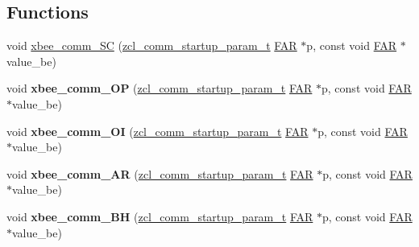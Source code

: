 \subsection*{Functions}
\begin{DoxyCompactItemize}
\item 
void \hyperlink{group__xbee__commissioning_ga886012f757de4a74d0c992d3ab04a373}{xbee\+\_\+comm\+\_\+\+SC} (\hyperlink{structzcl__comm__startup__param__t}{zcl\+\_\+comm\+\_\+startup\+\_\+param\+\_\+t} \hyperlink{group__hal_gaef060b3456fdcc093a7210a762d5f2ed}{F\+AR} $\ast$p, const void \hyperlink{group__hal_gaef060b3456fdcc093a7210a762d5f2ed}{F\+AR} $\ast$value\+\_\+be)
\item 
\mbox{\label{group__xbee__commissioning_ga38cdf15db91d2b0d3afc7288c4f4205a}} 
void {\bfseries xbee\+\_\+comm\+\_\+\+OP} (\hyperlink{structzcl__comm__startup__param__t}{zcl\+\_\+comm\+\_\+startup\+\_\+param\+\_\+t} \hyperlink{group__hal_gaef060b3456fdcc093a7210a762d5f2ed}{F\+AR} $\ast$p, const void \hyperlink{group__hal_gaef060b3456fdcc093a7210a762d5f2ed}{F\+AR} $\ast$value\+\_\+be)
\item 
\mbox{\label{group__xbee__commissioning_ga9b5ced283d3e0d514a28b676935a3b95}} 
void {\bfseries xbee\+\_\+comm\+\_\+\+OI} (\hyperlink{structzcl__comm__startup__param__t}{zcl\+\_\+comm\+\_\+startup\+\_\+param\+\_\+t} \hyperlink{group__hal_gaef060b3456fdcc093a7210a762d5f2ed}{F\+AR} $\ast$p, const void \hyperlink{group__hal_gaef060b3456fdcc093a7210a762d5f2ed}{F\+AR} $\ast$value\+\_\+be)
\item 
\mbox{\label{group__xbee__commissioning_gaa49a8990f5c4b47e2000f49b2258fc2c}} 
void {\bfseries xbee\+\_\+comm\+\_\+\+AR} (\hyperlink{structzcl__comm__startup__param__t}{zcl\+\_\+comm\+\_\+startup\+\_\+param\+\_\+t} \hyperlink{group__hal_gaef060b3456fdcc093a7210a762d5f2ed}{F\+AR} $\ast$p, const void \hyperlink{group__hal_gaef060b3456fdcc093a7210a762d5f2ed}{F\+AR} $\ast$value\+\_\+be)
\item 
\mbox{\label{group__xbee__commissioning_gae214f43be9de8be54815b9351935202f}} 
void {\bfseries xbee\+\_\+comm\+\_\+\+BH} (\hyperlink{structzcl__comm__startup__param__t}{zcl\+\_\+comm\+\_\+startup\+\_\+param\+\_\+t} \hyperlink{group__hal_gaef060b3456fdcc093a7210a762d5f2ed}{F\+AR} $\ast$p, const void \hyperlink{group__hal_gaef060b3456fdcc093a7210a762d5f2ed}{F\+AR} $\ast$value\+\_\+be)

\end{DoxyCompactItemize}

